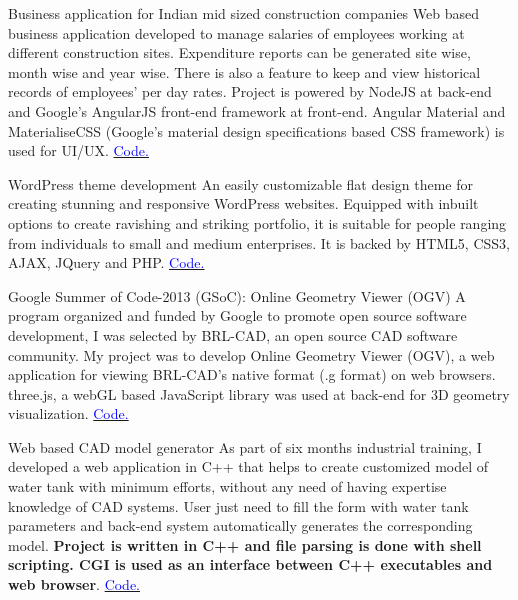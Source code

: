     {Business application for Indian mid sized construction companies}
    {}
    {}
    {}
    {Web based business application developed to manage salaries of employees working at different construction sites. Expenditure reports can be generated site wise, month wise and year wise. There is also a feature to keep and view historical records of employees' per day rates. Project is powered by NodeJS at back-end and Google's AngularJS front-end framework at front-end. Angular Material and MaterialiseCSS (Google's material design specifications based CSS framework) is used for UI/UX.
        \hfill
        \href{https://bitbucket.org/harman052/gh}{\textcolor{blue}{\scriptsize Code.}}
    }
    \vspace*{0.2\baselineskip}


    {WordPress theme development}
    {}
    {}
    {}
    {An easily customizable flat design theme for creating stunning and responsive WordPress websites. Equipped with inbuilt options to create ravishing and striking portfolio, it is suitable for people ranging from individuals to small and medium enterprises. It is backed by HTML5, CSS3, AJAX, JQuery and PHP.
        \hfill
        \href{https://bitbucket.org/harman052/csiom_theme}{\textcolor{blue}{\scriptsize Code.}}
    }
    \vspace*{0.2\baselineskip}


    {Google Summer of Code-2013 (GSoC): Online Geometry Viewer (OGV)}
    {}
    {}
    {}
    {A program organized and funded by Google to promote open source software development, I was selected by BRL-CAD, an open source CAD software community. My project was to develop Online Geometry Viewer (OGV), a web application for viewing BRL-CAD's native format (.g format) on web browsers. three.js, a webGL based JavaScript library was used at back-end for 3D geometry visualization.
        \hfill
        \href{https://github.com/BRL-CAD/geometry_viewer}{\textcolor{blue}{\scriptsize Code.}}
    }
    \vspace*{0.2\baselineskip}


    {Web based CAD model generator}
    {}
    {}
    {}
    {As part of six months industrial training, I developed a web application in C++ that helps to create customized model of water tank with minimum efforts, without any need of having expertise knowledge of CAD systems. User just need to fill the form with water tank parameters and back-end system automatically generates the corresponding model. \textbf{Project is written in C++ and file parsing is done with shell scripting. CGI is used as an interface between C++ executables and web browser}.
            \hfill
        \href{https://github.com/GreatDevelopers/wBRLCAD/tree/master/civil/watertank}{\textcolor{blue}{\scriptsize Code.}}
    }
    \vspace*{0.2\baselineskip}
